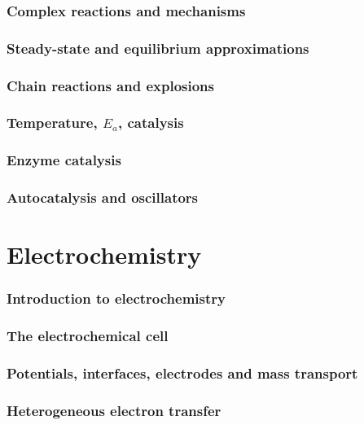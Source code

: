 \documentclass{article}
\numberwithin{theorem}{section}
\numberwithin{corollary}{section}
\numberwithin{postulate}{section}
\numberwithin{lemma}{section}
\numberwithin{definition}{section}
\begin{document}
\section{Complex reactions and mechanisms}

\section{Steady-state and equilibrium approximations}

\section{Chain reactions and explosions}

\section{Temperature, $E_a$, catalysis}

\section{Enzyme catalysis}

\section{Autocatalysis and oscillators}

\part{Electrochemistry}

\section{Introduction to electrochemistry}

\section{The electrochemical cell}

\section{Potentials, interfaces, electrodes and mass transport}

\section{Heterogeneous electron transfer}
\end{document}
